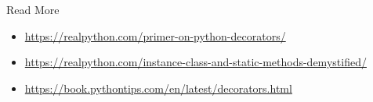 
\begin{frame}{Read More}
%
\begin{itemize}
\item \url{https://realpython.com/primer-on-python-decorators/}
\item \url{https://realpython.com/instance-class-and-static-methods-demystified/}
\item \url{https://book.pythontips.com/en/latest/decorators.html}
\end{itemize}
%
\end{frame}

